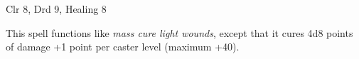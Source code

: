 
\begin{description*}
\item[Level:] Clr 8, Drd 9, Healing 8
\end{description*}

This spell functions like \textit{mass cure light wounds}, except that it cures
4d8 points of damage +1 point per caster level (maximum +40).